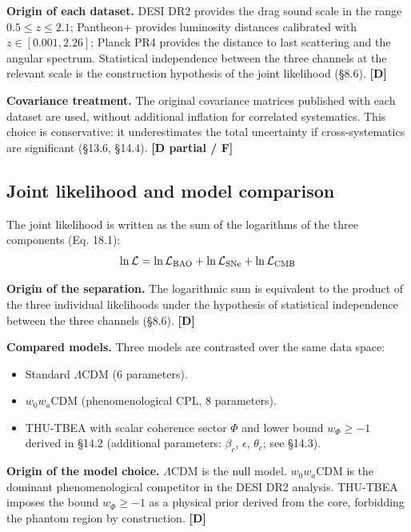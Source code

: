 ﻿\documentclass[11pt,letterpaper]{article}
\begin{document}
\textbf{Origin of each dataset.} DESI DR2 provides the drag sound scale in the range $0{.}5 \le z \le 2{.}1$; Pantheon+ provides luminosity distances calibrated with $z \in [0{.}001, 2{.}26]$; Planck PR4 provides the distance to last scattering and the angular spectrum. Statistical independence between the three channels at the relevant scale is the construction hypothesis of the joint likelihood (§8.6). \textbf{[D]}

\textbf{Covariance treatment.} The original covariance matrices published with each dataset are used, without additional inflation for correlated systematics. This choice is conservative: it underestimates the total uncertainty if cross-systematics are significant (§13.6, §14.4). \textbf{[D partial / F]}
\subsection{Joint likelihood and model comparison}
The joint likelihood is written as the sum of the logarithms of the three components (Eq. 18.1):
\begin{equation*}
  \resizebox{\ifdim\width>\linewidth \linewidth\else\width\fi}{!}{$\displaystyle \ln\mathcal{L} = \ln\mathcal{L}_{\text{BAO}} + \ln\mathcal{L}_{\text{SNe}} + \ln\mathcal{L}_{\text{CMB}}$}
\end{equation*}

\textbf{Origin of the separation.} The logarithmic sum is equivalent to the product of the three individual likelihoods under the hypothesis of statistical independence between the three channels (§8.6). \textbf{[D]}

\textbf{Compared models.} Three models are contrasted over the same data space:
\begin{itemize}
\item Standard $\Lambda$CDM (6 parameters).
\item $w_0w_a$CDM (phenomenological CPL, 8 parameters).
\item THU-TBEA with scalar coherence sector $\Phi$ and lower bound $w_\Phi \geq -1$ derived in §14.2 (additional parameters: $\beta_c$, $\epsilon$, $\theta_c$; see §14.3).
\end{itemize}

\textbf{Origin of the model choice.} $\Lambda$CDM is the null model. $w_0w_a$CDM is the dominant phenomenological competitor in the DESI DR2 analysis. THU-TBEA imposes the bound $w_\Phi \geq -1$ as a physical prior derived from the core, forbidding the phantom region by construction. \textbf{[D]}
\end{document}
